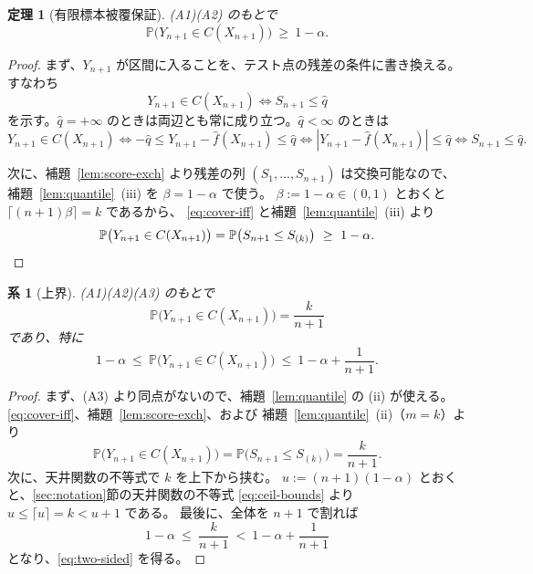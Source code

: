 \documentclass[a4paper,11pt]{jsarticle}
\theoremstyle{definition}
\theoremstyle{plain}
\newtheorem{theorem}[definition]{定理}
\newtheorem{corollary}[definition]{系}
\theoremstyle{remark}
\newcommand{\Prob}{\mathbb{P}}
\newcommand{\qhat}{\hat{q}}
\newcommand{\fhat}{\hat{f}}
\begin{document}
\begin{theorem}[有限標本被覆保証]
  \label{thm:coverage}
  (A1)(A2) のもとで
  \begin{equation*}
    \Prob\bigl(Y_{n+1}\in C(X_{n+1})\bigr)\ \ge\ 1-\alpha.
  \end{equation*}
\end{theorem}

\begin{proof}
  まず、$Y_{n+1}$ が区間に入ることを、テスト点の残差の条件に書き換える。すなわち
  \begin{equation}
    \label{eq:cover-iff}
    Y_{n+1}\in C(X_{n+1})\iff S_{n+1}\le\qhat
  \end{equation}
  を示す。$\qhat=+\infty$ のときは両辺とも常に成り立つ。$\qhat<\infty$ のときは
  \begin{equation*}
    Y_{n+1}\in C(X_{n+1})
    \iff -\qhat\le Y_{n+1}-\fhat(X_{n+1})\le\qhat
    \iff |Y_{n+1}-\fhat(X_{n+1})|\le\qhat
    \iff S_{n+1}\le\qhat.
  \end{equation*}

  次に、補題~\ref{lem:score-exch} より残差の列 $(S_1,\dots,S_{n+1})$ は交換可能なので、
  補題~\ref{lem:quantile}~(iii) を $\beta=1-\alpha$ で使う。
  $\beta:=1-\alpha\in(0,1)$ とおくと $\lceil(n+1)\beta\rceil=k$ であるから、
  \eqref{eq:cover-iff} と補題~\ref{lem:quantile}~(iii) より
  \begin{equation*}
    \Prob\bigl(Y_{n+1}\in C(X_{n+1})\bigr)
    =\Prob\bigl(S_{n+1}\le S_{(k)}\bigr)\ \ge\ 1-\alpha.
    \qedhere
  \end{equation*}
\end{proof}

\begin{corollary}[上界]
  \label{cor:upper}
  (A1)(A2)(A3) のもとで
  \begin{equation*}
    \Prob\bigl(Y_{n+1}\in C(X_{n+1})\bigr)=\frac{k}{n+1}
  \end{equation*}
  であり、特に
  \begin{equation}
    \label{eq:two-sided}
    1-\alpha\ \le\ \Prob\bigl(Y_{n+1}\in C(X_{n+1})\bigr)\ \le\ 1-\alpha+\frac{1}{n+1}.
  \end{equation}
\end{corollary}

\begin{proof}
  まず、(A3) より同点がないので、補題~\ref{lem:quantile} の (ii) が使える。
  \eqref{eq:cover-iff}、補題~\ref{lem:score-exch}、および
  補題~\ref{lem:quantile}~(ii)（$m=k$）より
  \begin{equation*}
    \Prob\bigl(Y_{n+1}\in C(X_{n+1})\bigr)=\Prob\bigl(S_{n+1}\le S_{(k)}\bigr)=\frac{k}{n+1}.
  \end{equation*}
  次に、天井関数の不等式で $k$ を上下から挟む。
  $u:=(n+1)(1-\alpha)$ とおくと、\ref{sec:notation}節の天井関数の不等式
  \eqref{eq:ceil-bounds} より $u\le\lceil u\rceil=k<u+1$ である。
  最後に、全体を $n+1$ で割れば
  \begin{equation*}
    1-\alpha\ \le\ \frac{k}{n+1}\ <\ 1-\alpha+\frac{1}{n+1}
  \end{equation*}
  となり、\eqref{eq:two-sided} を得る。
\end{proof}
\end{document}
